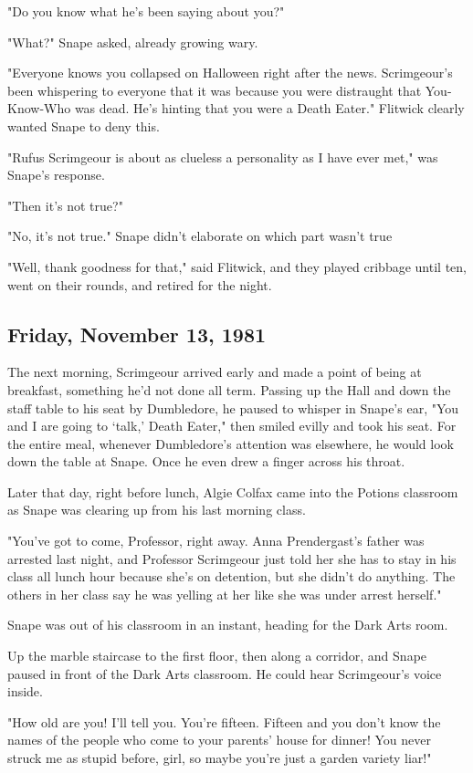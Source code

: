 "Do you know what he's been saying about you?"

"What?" Snape asked, already growing wary.

"Everyone knows you collapsed on Halloween right after the news. Scrimgeour's been whispering to everyone that it was because you were distraught that You-Know-Who was dead. He's hinting that you were a Death Eater." Flitwick clearly wanted Snape to deny this.

"Rufus Scrimgeour is about as clueless a personality as I have ever met," was Snape's response.

"Then it's not true?"

"No, it's not true." Snape didn't elaborate on which part wasn't true

"Well, thank goodness for that," said Flitwick, and they played cribbage until ten, went on their rounds, and retired for the night.

\subsection{Friday, November 13, 1981}

The next morning, Scrimgeour arrived early and made a point of being at breakfast, something he'd not done all term. Passing up the Hall and down the staff table to his seat by Dumbledore, he paused to whisper in Snape's ear, "You and I are going to `talk,' Death Eater," then smiled evilly and took his seat. For the entire meal, whenever Dumbledore's attention was elsewhere, he would look down the table at Snape. Once he even drew a finger across his throat.

Later that day, right before lunch, Algie Colfax came into the Potions classroom as Snape was clearing up from his last morning class.

"You've got to come, Professor, right away. Anna Prendergast's father was arrested last night, and Professor Scrimgeour just told her she has to stay in his class all lunch hour because she's on detention, but she didn't do anything. The others in her class say he was yelling at her like she was under arrest herself."

Snape was out of his classroom in an instant, heading for the Dark Arts room.

Up the marble staircase to the first floor, then along a corridor, and Snape paused in front of the Dark Arts classroom. He could hear Scrimgeour's voice inside.

"How old are you! I'll tell you. You're fifteen. Fifteen and you don't know the names of the people who come to your parents' house for dinner! You never struck me as stupid before, girl, so maybe you're just a garden variety liar!"

